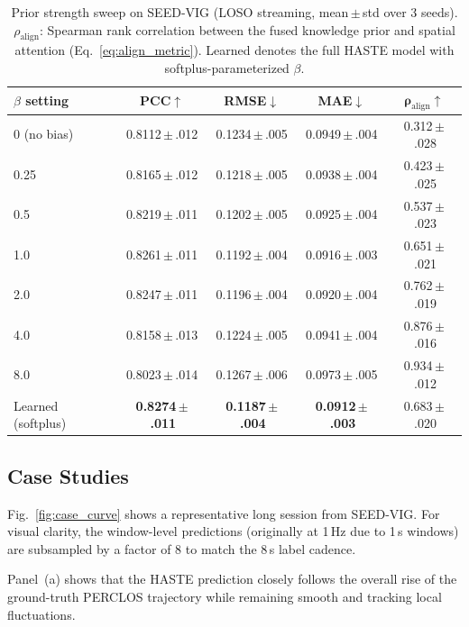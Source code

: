 \documentclass[preprint,12pt]{elsarticle}
\begin{document}
\begin{table}[!t]
\centering
\caption{Prior strength sweep on SEED-VIG (LOSO streaming, mean\,$\pm$\,std over 3 seeds).
$\rho_{\mathrm{align}}$: Spearman rank correlation between the fused knowledge prior and spatial attention (Eq.~\ref{eq:align_metric}).
Learned denotes the full HASTE model with softplus-parameterized $\beta$.}
\label{tab:beta_sweep}
\renewcommand{\arraystretch}{1.15}
\setlength{\tabcolsep}{4pt}
\footnotesize
\begin{tabular}{lcccc}
\toprule
$\beta$ \textbf{setting}
& \textbf{PCC}$\uparrow$
& \textbf{RMSE}$\downarrow$
& \textbf{MAE}$\downarrow$
& $\boldsymbol{\rho}_{\mathrm{align}}$$\uparrow$ \\
\midrule
0 (no bias)
& 0.8112\,$\pm$\,.012
& 0.1234\,$\pm$\,.005
& 0.0949\,$\pm$\,.004
& 0.312\,$\pm$\,.028 \\
0.25
& 0.8165\,$\pm$\,.012
& 0.1218\,$\pm$\,.005
& 0.0938\,$\pm$\,.004
& 0.423\,$\pm$\,.025 \\
0.5
& 0.8219\,$\pm$\,.011
& 0.1202\,$\pm$\,.005
& 0.0925\,$\pm$\,.004
& 0.537\,$\pm$\,.023 \\
1.0
& 0.8261\,$\pm$\,.011
& 0.1192\,$\pm$\,.004
& 0.0916\,$\pm$\,.003
& 0.651\,$\pm$\,.021 \\
2.0
& 0.8247\,$\pm$\,.011
& 0.1196\,$\pm$\,.004
& 0.0920\,$\pm$\,.004
& 0.762\,$\pm$\,.019 \\
4.0
& 0.8158\,$\pm$\,.013
& 0.1224\,$\pm$\,.005
& 0.0941\,$\pm$\,.004
& 0.876\,$\pm$\,.016 \\
8.0
& 0.8023\,$\pm$\,.014
& 0.1267\,$\pm$\,.006
& 0.0973\,$\pm$\,.005
& 0.934\,$\pm$\,.012 \\
\midrule
Learned (softplus)
& \textbf{0.8274\,$\pm$\,.011}
& \textbf{0.1187\,$\pm$\,.004}
& \textbf{0.0912\,$\pm$\,.003}
& 0.683\,$\pm$\,.020 \\
\bottomrule
\end{tabular}
\end{table}

\subsection{Case Studies}
\label{sec:exp_case}

Fig.~\ref{fig:case_curve} shows a representative long session from SEED-VIG.
For visual clarity, the window-level predictions (originally at 1\,Hz due to 1\,s windows) are subsampled by a factor of 8
to match the 8\,s label cadence.

Panel~(a) shows that the HASTE prediction closely follows the overall rise of the ground-truth PERCLOS trajectory
while remaining smooth and tracking local fluctuations.
\end{document}
